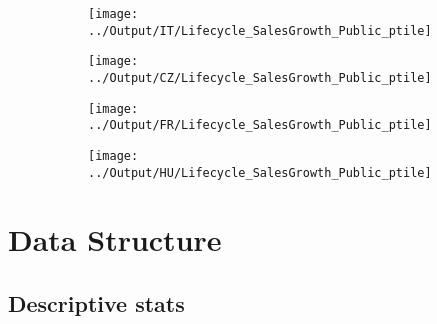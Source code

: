\documentclass[12pt,notitlepage]{article}
\begin{document}
\begin{figure}[!htpb]
\centering
\caption{Sales Growth (Percentile - Public)}
\begin{subfigure}{.49\textwidth}
    \centering
 \texttt{[image: ../Output/IT/Lifecycle\_SalesGrowth\_Public\_ptile]}
\end{subfigure}%
\begin{subfigure}{.49\textwidth}
    \centering
 \texttt{[image: ../Output/CZ/Lifecycle\_SalesGrowth\_Public\_ptile]}
\end{subfigure}
\begin{subfigure}{.49\textwidth}
    \centering
 \texttt{[image: ../Output/FR/Lifecycle\_SalesGrowth\_Public\_ptile]}
\end{subfigure}%
\begin{subfigure}{.49\textwidth}
    \centering
 \texttt{[image: ../Output/HU/Lifecycle\_SalesGrowth\_Public\_ptile]}
\end{subfigure}
\end{figure}
\pagebreak



\FloatBarrier
\section{Data Structure} %
\label{sec:data_structure}
\FloatBarrier


\subsection{Descriptive stats}
\begin{table}[!htpb]
    \centering
    \caption{Descriptive Statistics - Italy}
    \label{tab:my_label}
\end{table}

\begin{table}[!htpb]
    \centering
    \caption{Descriptive Statistics - France}
    \label{tab:my_label}
\end{table}
\end{document}
